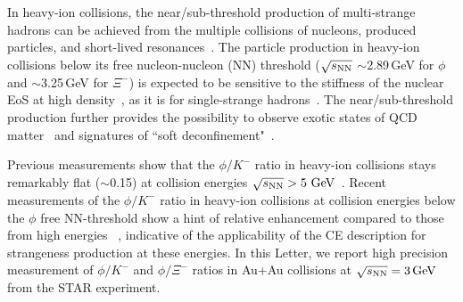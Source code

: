 \documentclass[%
 reprint,	
showpacs,
 amsmath,amssymb,
 aps,
 superscriptaddress,
]{revtex4-1}
\begin{document}

In heavy-ion collisions, the near/sub-threshold production of multi-strange hadrons can be achieved from the multiple collisions of nucleons, produced particles, and short-lived resonances~\cite{ZEEB2004297}. The particle production in heavy-ion collisions below its free nucleon-nucleon (NN) threshold ($\sqrt{s_{\rm NN}}$ $\sim$2.89\,GeV for $\phi$ and $\sim$3.25\,GeV for $\Xi^-$) is expected to be sensitive to the stiffness of the nuclear EoS at high density~\cite{yong2021double}, as it is for single-strange hadrons~\cite{KO.PhysRevLett.55.2661,FUCHS20061_kaons}. The near/sub-threshold production further provides the possibility
to observe exotic states of QCD matter~\cite{McLerran:2007qj} and signatures of ``soft deconfinement"~\cite{Fukushima:2020cmk}.
 
Previous measurements 
show that the $\phi/K^-$ ratio in heavy-ion collisions stays remarkably flat ($\sim$0.15) at collision energies ${\sqrt{s_{\rm NN}} > \textup{5 GeV}}$~\cite{E917_phi,NA49_phi,star_bes_strangeness}. Recent measurements of the $\phi/K^-$ ratio in heavy-ion collisions at collision energies below the $\phi$ free NN-threshold %
show a hint of relative enhancement compared to those from high energies
~\cite{FOPI_phi_AlAl,FOPI_phi_NiNi,HADES_phi_ArKCl,HADES_phi_AuAu}, indicative of the applicability of the CE description for strangeness production at these energies. In this Letter, we report high precision measurement of $\phi/K^-$ and $\phi/\Xi^-$ ratios in Au+Au collisions at ${\sqrt{s_{\rm NN}} = \rm{3\,GeV}}$ from the STAR experiment.
\end{document}
